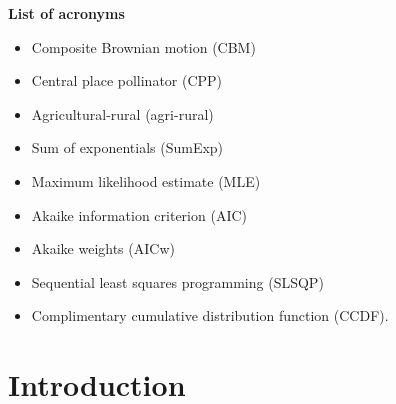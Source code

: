 \documentclass[11pt,usenames,dvipsnames,a4paper]{article}
\begin{document}
\noindent
\Large{\textbf{List of acronyms}}\\
\noindent
\begin{itemize}
	\item Composite Brownian motion (CBM)
	\item Central place pollinator (CPP)
	\item Agricultural-rural (agri-rural)
	\item Sum of exponentials (SumExp)
	\item Maximum likelihood estimate (MLE)
	\item Akaike information criterion (AIC)
	\item Akaike weights (AICw)
	\item Sequential least squares programming (SLSQP)
	\item Complimentary cumulative distribution function (CCDF).
\end{itemize}

\section{Introduction}
\end{document}
